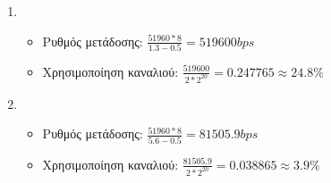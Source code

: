 \documentclass[a4paper,9pt]{article}
\begin{document}
\begin{enumerate}
    \item 
        \begin{itemize}
            \item Ρυθμός μετάδοσης: $\frac{51960*8}{1.3-0.5}=519600bps$
            \item Χρησιμοποίηση καναλιού: $\frac{519600}{2*2^{20}} = 0.247765
                \approx 24.8\% $
        \end{itemize}
    \item 
        \begin{itemize}
            \item Ρυθμός μετάδοσης: $\frac{51960*8}{5.6-0.5}=81505.9bps$
            \item Χρησιμοποίηση καναλιού: $\frac{81505.9}{2*2^{20}} = 0.038865
                \approx 3.9\% $
        \end{itemize}
\end{enumerate}
\end{document}
